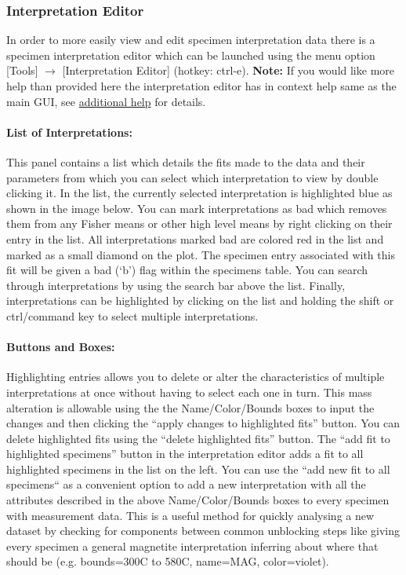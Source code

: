 \documentclass[11pt]{book}
\begin{document}
{{\subsubsection{Interpretation Editor}\label{interpretation-editor} %

In order to more easily view and edit specimen interpretation data there is a specimen interpretation editor which can be launched using the menu option [Tools] $\rightarrow$ [Interpretation Editor] (hotkey: ctrl-e). \textbf{Note:} If you would like more help than provided here the interpretation editor has in context help same as the main GUI, see \hyperref[add-help]{additional help} for details.
\paragraph{List of Interpretations:}\label{IE-list} This panel contains a list which details the fits made to the data and their parameters from which you can select which interpretation to view by double clicking it. In the list, the currently selected interpretation is highlighted blue as shown in the image below. You can mark interpretations as bad which removes them from any Fisher means or other high level means by right clicking on their entry in the list. All interpretations marked bad are colored red in the list and marked as a small diamond on the plot. The specimen entry associated with this fit will be given a bad (`b') flag within the specimens table. You can search through interpretations by using the search bar above the list. Finally, interpretations can be highlighted by clicking on the list and holding the shift or ctrl/command key to select multiple interpretations.
\paragraph{Buttons and Boxes:}\label{IE-buttons} Highlighting entries allows you to delete or alter the characteristics of multiple interpretations at once without having to select each one in turn. This mass alteration is allowable using the the Name/Color/Bounds boxes to input the changes and then clicking the ``apply changes to highlighted fits'' button. You can delete highlighted fits using the ``delete highlighted fits'' button. The ``add fit to highlighted specimens'' button in the interpretation editor adds a fit to all highlighted specimens in the list on the left. You can use the ``add new fit to all specimens`` as a convenient option to add a new interpretation with all the attributes described in the above Name/Color/Bounds boxes to every specimen with measurement data. This is a useful method for quickly analysing a new dataset by checking for components between common unblocking steps like giving every specimen a general magnetite interpretation inferring about where that should be (e.g. bounds=300C to 580C, name=MAG, color=violet).
}}
\end{document}
